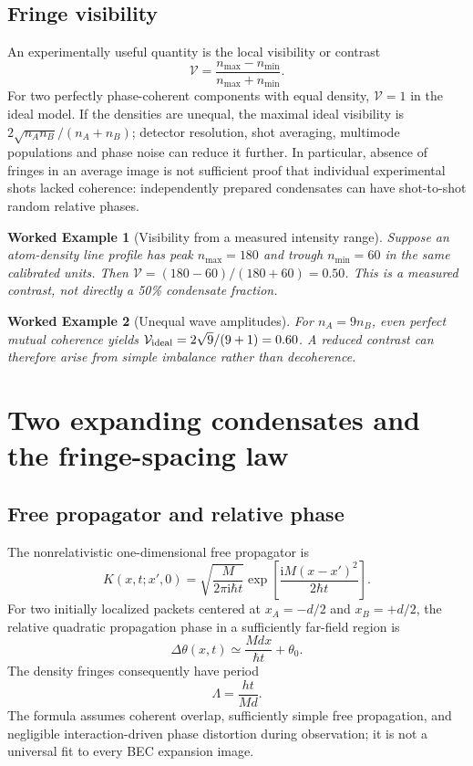 \documentclass[11pt,a4paper]{article}
\newtheorem{example}{Worked Example}
\newcommand{\ii}{\mathrm i}
\newcommand{\hc}{\hbar}
\begin{document}
\subsection{Fringe visibility}
An experimentally useful quantity is the local visibility or contrast
\begin{equation}\mathcal V=\frac{n_{\max}-n_{\min}}{n_{\max}+n_{\min}}.\label{eq:visibility}\end{equation}
For two perfectly phase-coherent components with equal density, $\mathcal V=1$ in the ideal model. If the densities are unequal, the maximal ideal visibility is $2\sqrt{n_An_B}/(n_A+n_B)$; detector resolution, shot averaging, multimode populations and phase noise can reduce it further. In particular, absence of fringes in an average image is not sufficient proof that individual experimental shots lacked coherence: independently prepared condensates can have shot-to-shot random relative phases.

\begin{example}[Visibility from a measured intensity range]
Suppose an atom-density line profile has peak $n_{\max}=180$ and trough $n_{\min}=60$ in the same calibrated units. Then $\mathcal V=(180-60)/(180+60)=0.50$. This is a measured contrast, not directly a 50\% condensate fraction.
\end{example}

\begin{example}[Unequal wave amplitudes]
For $n_A=9n_B$, even perfect mutual coherence yields $\mathcal V_{\rm ideal}=2\sqrt9/(9+1)=0.60$. A reduced contrast can therefore arise from simple imbalance rather than decoherence.
\end{example}

\section{Two expanding condensates and the fringe-spacing law}
\subsection{Free propagator and relative phase}
The nonrelativistic one-dimensional free propagator is
\begin{equation}
K(x,t;x',0)=\sqrt{\frac{M}{2\pi\ii\hc t}}\exp\!\left[\frac{\ii M(x-x')^2}{2\hc t}\right].
\end{equation}
For two initially localized packets centered at $x_A=-d/2$ and $x_B=+d/2$, the relative quadratic propagation phase in a sufficiently far-field region is
\begin{equation}
\Delta\theta(x,t)\simeq\frac{Mdx}{\hc t}+\theta_0.
\end{equation}
The density fringes consequently have period
\begin{equation}\boxed{\Lambda=\frac{ht}{Md}.}\label{eq:spacing}\end{equation}
The formula assumes coherent overlap, sufficiently simple free propagation, and negligible interaction-driven phase distortion during observation; it is not a universal fit to every BEC expansion image.
\end{document}
